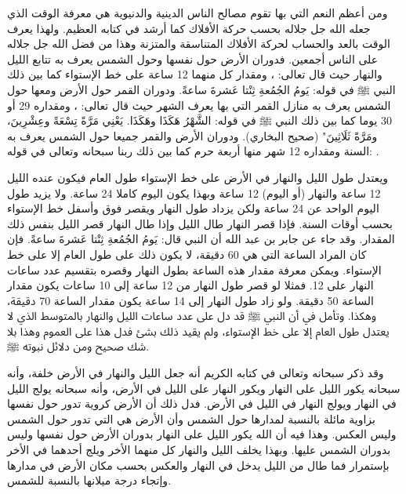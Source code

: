 ومن أعظم النعم التي بها تقوم مصالح الناس الدينية والدنيوية هي معرفة الوقت الذي جعله الله جل جلاله بحسب حركة الأفلاك كما أرشد في كتابه العظيم. ولهذا يعرف الوقت بالعد والحساب لحركة الأفلاك المتناسقة والمتزنة وهذا من فضل الله جل جلاله على الناس أجمعين. فدوران الأرض حول نفسها وحول الشمس يعرف به تتابع الليل والنهار حيث قال تعالى: \quranayah*[25][62]{\footnotesize \surahname*[25]}، ومقدار كل منهما 12 ساعة على خط الإستواء كما بين ذلك النبي ﷺ في قوله: يَومُ الجُمُعةِ ثِنْتا عَشرةَ ساعةً. ودوران القمر حول الأرض ومعها حول الشمس يعرف به منازل القمر التي بها يعرف الشهر حيث قال تعالى: \quranayah*[36][39]{\footnotesize \surahname*[36]}، ومقداره 29 أو 30 يوما كما بين ذلك النبي ﷺ في قوله: الشَّهْرُ هَكَذَا وهَكَذَا. يَعْنِي مَرَّةً تِسْعَةً وعِشْرِينَ، ومَرَّةً ثَلَاثِينَ" {\footnotesize (صحيح البخاري)}. ودوران الأرض والقمر جميعا حول الشمس يعرف به السنة ومقداره 12 شهر منها أربعة حرم كما بين ذلك ربنا سبحانه وتعالى في قوله: \quranayah*[9][36]{\footnotesize \surahname*[9]}. 

ويعتدل طول الليل والنهار في الأرض على خط الإستواء طول العام فيكون عنده الليل 12 ساعة والنهار (أو اليوم) 12 ساعة وبهذا يكون اليوم كاملا 24 ساعة. ولا يزيد طول اليوم الواحد عن 24 ساعة ولكن يزداد طول النهار ويقصر فوق وأسفل خط الإستواء بحسب أوقات السنة. فإذا قصر النهار طال الليل وإذا طال النهار قصر الليل بنفس ذلك المقدار. وقد جاء عن جابر بن عبد الله أن النبي قال: يَومُ الجُمُعةِ ثِنْتا عَشرةَ ساعةً. فإن كان المراد الساعة التي هي 60 دقيقة، لا يكون ذلك على طول العام إلا على خط الإستواء. ويمكن معرفة مقدار هذه الساعة بطول النهار وقصره بتقسيم عدد ساعات النهار على 12. فمثلا لو قصر طول النهار من 12 ساعة إلى 10 ساعات يكون مقدار الساعة 50 دقيقة. ولو زاد طول النهار إلى 14 ساعة يكون مقدار الساعة 70 دقيقة، وهكذا. وتأمل في أن النبي ﷺ  قد دل على عدد ساعات الليل والنهار بالمتوسط الذي لا يعتدل طول العام إلا على خط الإستواء، ولم يقيد ذلك بشئ فدل هذا على العموم وهذا بلا شك صحيح ومن دلائل نبوته ﷺ.

وقد ذكر سبحانه وتعالى في كتابه الكريم أنه جعل الليل والنهار في الأرض خلفة، وأنه سبحانه يكور الليل على النهار ويكور النهار على الليل في الأرض، وأنه سبحانه يولج الليل في النهار ويولج النهار في الليل في الأرض. فدل ذلك أن الأرض كروية تدور حول نفسها بزاوية مائلة بالنسبة لمدارها حول الشمس وأن الأرض هي التي تدور حول الشمس وليس العكس. وهذا فيه أن الله يكور الليل على النهار بدوران الأرض حول نفسها وليس بدوران الشمس عليها. وبهذا يخلف الليل والنهار كل منهما الأخر ويلج أحدهما في الأخر بإستمرار فما طال من الليل يدخل في النهار والعكس بحسب مكان الأرض في مدارها وإتجاء درجة ميلانها بالنسبة للشمس.

